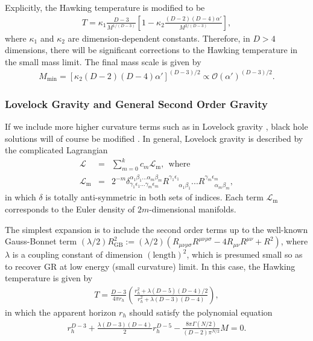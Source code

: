\documentclass[12pt]{article}
\newcommand{\2}{$^2$}
\newcommand{\3}{$^3$}
\newcommand{\4}{$_4$}
\newcommand{\5}{$_5$}
\begin{document}
Explicitly, the Hawking temperature is modified to be
\begin{eqnarray}
T = \kappa_{1} \frac{D-3}{M^{1/(D-3)}} \left[ 1 - \kappa_{2} \frac{(D-2)(D-4)\alpha'}{M^{2/(D-3)}} \right],
\end{eqnarray}
where $\kappa_{1}$ and $\kappa_{2}$ are dimension-dependent constants. Therefore, in $D > 4$ dimensions, there will be significant corrections to the Hawking temperature in the small mass limit. The final mass scale is given by
\begin{eqnarray}
M_{\mathrm{min}} = \left[ \kappa_{2} (D-2)(D-4)\alpha' \right]^{(D-3)/2} \propto \mathcal{O}\left( \alpha' \right)^{(D-3)/2}.
\end{eqnarray}

\subsubsection{Lovelock Gravity and General Second Order Gravity}

If we include more higher curvature terms such as in Lovelock gravity \cite{Lovelock1, Lovelock2}, black hole solutions will of course be modified \cite{Myers:1988ze}. In general, Lovelock gravity  is described by the complicated Lagrangian
\begin{eqnarray}
\mathcal{L} &=& \sum_{m=0}^{k}c_{m} \mathcal{L}_\mathrm{m}, ~~\text{where}\\
\mathcal{L}_{\mathrm{m}} &=& 2^{-m} \delta^{\alpha_{1} \beta_{1} ... \alpha_{m} \beta_{m}}_{\gamma_{1} \epsilon_{1} ... \gamma_{m} \epsilon_{m}} R^{\gamma_{1}\epsilon_{1}}_{\;\;\;\;\;\;\alpha_{1}\beta_{1}} ... R^{\gamma_{m} \epsilon_{m}}_{\;\;\;\;\;\;\alpha_{m}\beta_{m}},
\end{eqnarray}
in which $\delta$ is totally anti-symmetric in both sets of indices. Each term $\mathcal{L}_{\mathrm{m}}$ corresponds to the Euler density of $2m$-dimensional manifolds.

The simplest expansion is to include the second order terms up to the well-known Gauss-Bonnet term $(\lambda/2) R_{\mathrm{GB}}^{2} := (\lambda/2) (R_{\mu\nu\rho\sigma}R^{\mu\nu\rho\sigma}-4 R_{\mu\nu}R^{\mu\nu}+R^{2})$, where $\lambda$ is a coupling constant of dimension $(\text{length})^2$, which is presumed small so as to recover GR at low energy (small curvature) limit. In this case, the Hawking temperature is given by 
\begin{eqnarray}
T = \frac{D-3}{4\pi r_{h}} \left( \frac{r_{h}^{2} + \lambda (D-5)(D-4)/ 2}{r_{h}^{2} + \lambda (D-3) (D-4)} \right),
\end{eqnarray}
in which the apparent horizon $r_{h}$ should satisfy the polynomial equation
\begin{eqnarray}
r_{h}^{D-3} + \frac{\lambda (D-3) (D-4)}{2} r_{h}^{D-5} - \frac{8\pi \Gamma(N/2)}{(D-2)\pi^{N/2}} M = 0.
\end{eqnarray}
\end{document}
